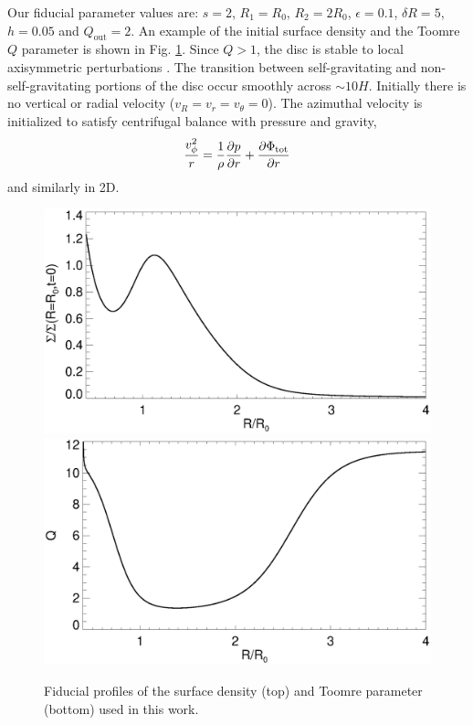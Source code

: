 Our fiducial parameter values are: $s=2$, $R_{1}=R_0$, $R_{2}=2R_0$,
$\epsilon=0.1$, $\delta R=5$, $h=0.05$ and
$Q_\mathrm{out}=2$. An example of the initial surface density and the
Toomre $Q$ parameter is shown in
Fig. \ref{initial_surf}. Since $Q>1$, the disc is stable to local
axisymmetric perturbations \citep{toomre64}. %
The transition between self-gravitating and 
non-self-gravitating portions of the disc occur smoothly across
$\sim10H$. Initially there is no vertical or radial velocity
($v_R = v_r = v_\theta = 0$). The azimuthal velocity is initialized to
satisfy centrifugal balance with pressure and gravity,
\begin{align}
  \frac{v_\phi^2}{r} = \frac{1}{\rho}\frac{\partial p}{\partial r} + \frac{\partial
    \Phi_\mathrm{tot}}{\partial r}
\end{align}
and similarly in 2D.  

\begin{figure}
  \includegraphics[width=\linewidth,clip=true,trim=0cm 1.7cm 0cm
  0cm]{figures/compare_profiles_dens000} 
  \includegraphics[width=\linewidth]{figures/compare_profiles_Q000}
  \caption{Fiducial profiles of the surface density (top) and Toomre
    parameter (bottom) used in this work.\label{initial_surf}}
\end{figure}

